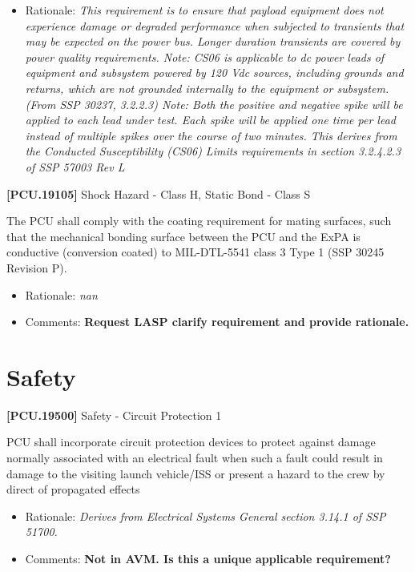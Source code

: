 \documentclass[12pt,oneside,oldfontcommands]{memoir}
\begin{document}
\begin{itemize}
\item{} Rationale: \emph{This requirement is to ensure that payload equipment does not experience damage or degraded performance when subjected to transients that may be expected on the power bus. Longer duration transients are covered by power quality requirements. Note: CS06 is applicable to dc power leads of equipment and subsystem powered by 120 Vdc sources, including grounds and returns, which are not grounded internally to the equipment or subsystem. (From SSP 30237, 3.2.2.3) Note: Both the positive and negative spike will be applied to each lead under test. Each spike will be applied one time per lead instead of multiple spikes over the course of two minutes. This derives from the Conducted Susceptibility (CS06) Limits requirements in section 3.2.4.2.3 of SSP 57003 Rev L}

\end{itemize}

\textbf{[PCU.19105]} Shock Hazard - Class H, Static Bond - Class S

The \gls{PCU} shall comply with the coating requirement for mating surfaces, such that the mechanical bonding surface between the \gls{PCU} and the \gls{ExPA} is conductive (conversion coated) to MIL-DTL-5541 class 3 Type 1 (SSP 30245 Revision P).

\begin{itemize}
\item{} Rationale: \emph{nan}

\item{} Comments: \textbf{Request LASP clarify requirement and provide rationale.}

\end{itemize}

\section{Safety}
\label{safety}

\textbf{[PCU.19500]} Safety - Circuit Protection 1

\gls{PCU} shall incorporate circuit protection devices to protect against damage normally associated with an electrical fault when such a fault could result in damage to the visiting launch vehicle\slash \gls{ISS} or present a hazard to the crew by direct of propagated effects

\begin{itemize}
\item{} Rationale: \emph{Derives from Electrical Systems General section 3.14.1 of SSP 51700.}

\item{} Comments: \textbf{Not in AVM. Is this a unique applicable requirement?}

\end{itemize}
\end{document}
